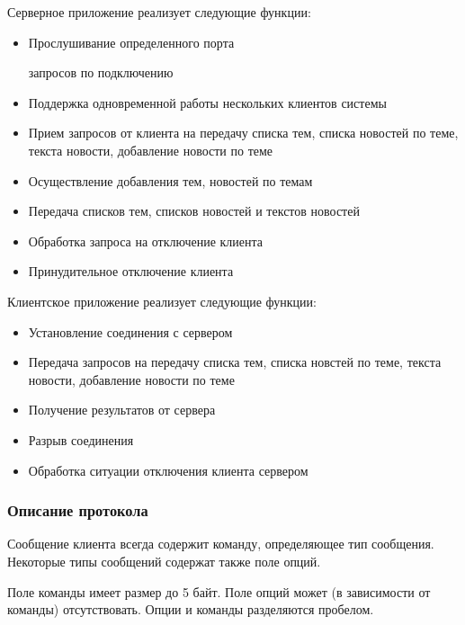 Серверное приложение реализует следующие функции:
\begin{itemize}
\item Прослушивание определенного порта

 запросов по подключению

\item Поддержка одновременной работы нескольких клиентов системы

\item Прием запросов от клиента на передачу списка тем, списка новостей по теме, текста новости, добавление новости по теме

\item Осуществление добавления тем, новостей по темам

\item Передача списков тем, списков новостей и текстов новостей

\item Обработка запроса на отключение клиента

\item Принудительное отключение клиента
\end{itemize}

Клиентское приложение реализует следующие функции:

\begin{itemize}
\item Установление соединения с сервером

\item Передача запросов на передачу списка тем, списка новстей по теме, текста новости, добавление новости по теме

\item Получение результатов от сервера

\item Разрыв соединения

\item Обработка ситуации отключения клиента сервером
\end{itemize}


\subsubsection{Описание протокола}
Сообщение клиента всегда содержит команду, определяющее тип сообщения. Некоторые типы сообщений содержат также поле опций.

Поле команды имеет размер до 5 байт. Поле опций может (в зависимости от команды) отсутствовать. Опции и команды разделяются пробелом.

